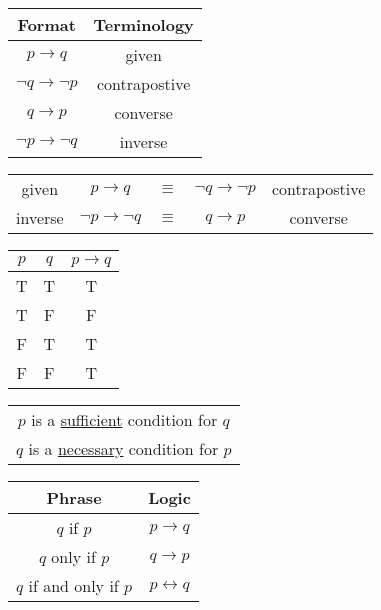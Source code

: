 \documentclass{article}
\begin{document}
\begin{center}
  \begin{tabular}{c|c}
    Format                          & Terminology   \\
    \hline
    \(p \rightarrow q\)             & given         \\
    \(\lnot q \rightarrow \lnot p\) & contrapostive \\
    \(q \rightarrow p\)             & converse      \\
    \(\lnot p \rightarrow \lnot q\) & inverse       \\
  \end{tabular}
  \qquad
  \begin{tabular}{ccccc}
    given   & \(p \rightarrow q\)             & \(\equiv\) & \(\lnot q \rightarrow \lnot p\) & contrapostive \\
    inverse & \(\lnot p \rightarrow \lnot q\) & \(\equiv\) & \(q \rightarrow p\)             & converse
  \end{tabular}
\end{center}

\begin{center}
  \begin{tabular}{c|c|c}
    \(p\) & \(q\) & \(p \rightarrow q\) \\
    \hline
    T     & T     & T                   \\
    T     & F     & F                   \\
    F     & T     & T                   \\
    F     & F     & T                   \\
  \end{tabular}
  \quad
  \begin{tabular}{c}
    \(p\) is a \underline{sufficient} condition for \(q\) \\
    \(q\) is a \underline{necessary} condition for \(p\)
  \end{tabular}
  \quad
  \begin{tabular}{c|c}
    Phrase                     & Logic                   \\
    \hline
    \(q\) if \(p\)             & \(p \rightarrow q\)     \\
    \(q\) only if \(p\)        & \(q \rightarrow p\)     \\
    \(q\) if and only if \(p\) & \(p \leftrightarrow q\)
  \end{tabular}
\end{center}
\end{document}
